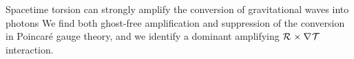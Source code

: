 \begin{alertblock}{Spacetime torsion can strongly amplify the conversion of
    gravitational waves into photons}
  \centering
  We find both ghost-free amplification and suppression of the conversion in
  Poincar\'e gauge theory, and we identify
  a dominant amplifying $\MAGF{}\times\rcD{}\MAGT{}$ interaction.
\end{alertblock}
